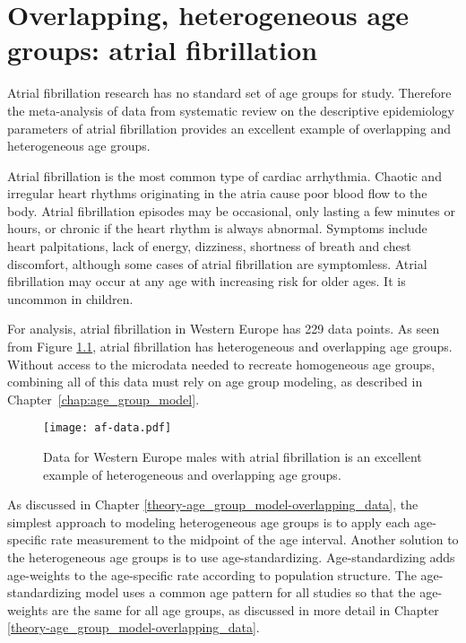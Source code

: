 \chapter{Overlapping, heterogeneous age groups: atrial fibrillation}
\label{applications-age_groups}

Atrial fibrillation research has no standard set of age groups for
study.  Therefore the meta-analysis of data from systematic review on
the descriptive epidemiology parameters of atrial fibrillation
provides an excellent example of overlapping and heterogeneous age
groups.

Atrial fibrillation is the most common type of cardiac arrhythmia.
Chaotic and irregular heart rhythms originating in the atria cause
poor blood flow to the body.  Atrial fibrillation episodes may be
occasional, only lasting a few minutes or hours, or chronic if the
heart rhythm is always abnormal.  Symptoms include heart palpitations,
lack of energy, dizziness, shortness of breath and chest discomfort,
although some cases of atrial fibrillation are symptomless.  Atrial
fibrillation may occur at any age with increasing risk for older ages.
It is uncommon in children. \cite{rich_epidemiology_2009,
  rho_asymptomatic_2005, fuster_acc/aha/esc_2006, radford_atrial_1977}

For analysis, atrial fibrillation in Western Europe has 229 data
points.  As seen from Figure \ref{fig:app-af data}, atrial
fibrillation has heterogeneous and overlapping age groups.  Without
access to the microdata needed to recreate homogeneous age groups, combining all of this data must rely on age group modeling, as described in Chapter~\ref{chap:age_group_model}.

    \begin{figure}[h]
        \begin{center}
            \texttt{[image: af-data.pdf]}
            \caption{Data for Western Europe males with atrial
              fibrillation is an excellent example of heterogeneous
              and overlapping age groups.}
            \label{fig:app-af data}
        \end{center}
    \end{figure}

As discussed in Chapter \ref{theory-age_group_model-overlapping_data},
the simplest approach to modeling heterogeneous age groups is to apply
each age-specific rate measurement to the midpoint of the age interval.
Another solution to the heterogeneous age groups is to use age-standardizing.
Age-standardizing adds age-weights to the age-specific rate according
to population structure.  The age-standardizing model uses a common
age pattern for all studies so that the age-weights are the same for
all age groups, as discussed in more detail in Chapter
\ref{theory-age_group_model-overlapping_data}.

